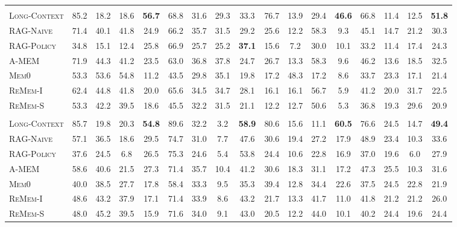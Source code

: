 \begin{table}[t]
{\begin{tabular}{lccc>{\columncolor{cuscol}}c|ccc>{\columncolor{cuscol}}c|ccc>{\columncolor{cuscol}}c|ccc>{\columncolor{cuscol}}c}
\rowcolor{llmheader}
\multicolumn{17}{c}{\textbf{\texttt{Llama-4-Maverick}}} \\
\textsc{Long-Context} & 85.2 & 18.2 & 18.6 & \textbf{56.7} & 68.8 & 31.6 & 29.3 & 33.3 & 76.7 & 13.9 & 29.4 & \textbf{46.6} & 66.8 & 11.4 & 12.5 & \textbf{51.8} \\
\textsc{RAG-Naive}\citep{lewis2020retrieval}    & 71.4 & 40.1 & 41.8 & 24.9 & 66.2 & 35.7 & 31.5 & 29.2 & 25.6 & 12.2 & 58.3 & 9.3 & 45.1 & 14.7 & 21.2 & 30.3 \\
\textsc{RAG-Policy}   & 34.8 & 15.1 & 12.4 & 25.8 & 66.9 & 25.7 & 25.2 & \textbf{37.1} & 15.6 & 7.2 & 30.0 & 10.1 & 33.2 & 11.4 & 17.4 & 24.3 \\
\textsc{A-MEM}~\citep{xu2026mem}        & 71.9 & 44.3 & 41.2 & 23.5 & 63.0 & 36.8 & 37.8 & 24.7 & 26.7 & 13.3 & 58.3 & 9.6 & 46.2 & 13.6 & 18.5 & 32.5 \\
\textsc{Mem0}~\citep{chhikara2025mem0}         & 53.3 & 53.6 & 54.8 & 11.2 & 43.5 & 29.8 & 35.1 & 19.8 & 17.2 & 48.3 & 17.2 & 8.6 & 33.7 & 23.3 & 17.1 & 21.4 \\
\textsc{ReMem-I}~\citep{shu2026remem}      & 62.4 & 44.8 & 41.8 & 20.0 & 65.6 & 34.5 & 34.7 & 28.1 & 16.1 & 16.1 & 56.7 & 5.9 & 41.2 & 20.0 & 31.7 & 22.5 \\
\textsc{ReMem-S}~\citep{shu2026remem}      & 53.3 & 42.2 & 39.5 & 18.6 & 45.5 & 32.2 & 31.5 & 21.1 & 12.2 & 12.7 & 50.6 & 5.3 & 36.8 & 19.3 & 29.6 & 20.9 \\
\midrule

\rowcolor{llmheader}
\multicolumn{17}{c}{\textbf{\texttt{GPT-5-mini}}} \\
\textsc{Long-Context} & 85.7 & 19.8 & 20.3 & \textbf{54.8} & 89.6 & 32.2 & 3.2 & \textbf{58.9} & 80.6 & 15.6 & 11.1 & \textbf{60.5} & 76.6 & 24.5 & 14.7 & \textbf{49.4} \\
\textsc{RAG-Naive}\citep{lewis2020retrieval}    & 57.1 & 36.5 & 18.6 & 29.5 & 74.7 & 31.0 & 7.7 & 47.6 & 30.6 & 19.4 & 27.2 & 17.9 & 48.9 & 23.4 & 10.3 & 33.6 \\
\textsc{RAG-Policy}   & 37.6 & 24.5 & 6.8 & 26.5 & 75.3 & 24.6 & 5.4 & 53.8 & 24.4 & 10.6 & 22.8 & 16.9 & 37.0 & 19.6 & 6.0 & 27.9 \\
\textsc{A-MEM}~\citep{xu2026mem}        & 58.6 & 40.6 & 21.5 & 27.3 & 71.4 & 35.7 & 10.4 & 41.2 & 30.6 & 18.3 & 31.1 & 17.2 & 47.3 & 25.5 & 10.3 & 31.6 \\
\textsc{Mem0}~\citep{chhikara2025mem0}         & 40.0 & 38.5 & 27.7 & 17.8 & 58.4 & 33.3 & 9.5 & 35.3 & 39.4 & 12.8 & 34.4 & 22.6 & 37.5 & 24.5 & 22.8 & 21.9 \\
\textsc{ReMem-I}~\citep{shu2026remem}      & 48.6 & 43.2 & 37.9 & 17.1 & 71.4 & 33.9 & 8.6 & 43.2 & 21.7 & 13.3 & 41.7 & 11.0 & 41.8 & 21.2 & 21.2 & 26.0 \\
\textsc{ReMem-S}~\citep{shu2026remem}      & 48.0 & 45.2 & 39.5 & 15.9 & 71.6 & 34.0 & 9.1 & 43.0 & 20.5 & 12.2 & 44.0 & 10.1 & 40.2 & 24.4 & 19.6 & 24.4 \\
\midrule


\end{tabular}}
\end{table}
